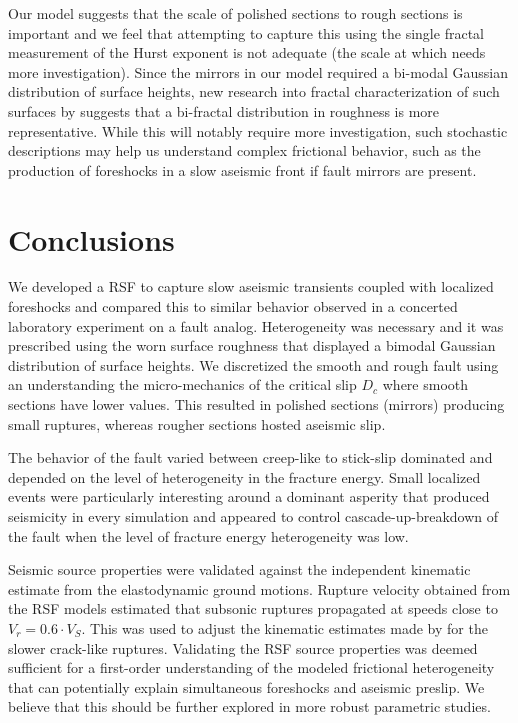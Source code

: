 \documentclass[preprint,1p, 10pt,authoryear]{elsarticle}
\begin{document}
Our model suggests that the scale of polished sections to rough sections is important and we feel that attempting to capture this using the single fractal measurement of the Hurst exponent is not adequate (the scale at which needs more investigation). Since the mirrors in our model required a bi-modal Gaussian distribution of surface heights, new research into fractal characterization of such surfaces by \citet{Hu2019} suggests that a bi-fractal distribution in roughness is more representative. While this will notably require more investigation, such stochastic descriptions may help us understand complex frictional behavior, such as the production of foreshocks in a slow aseismic front if fault mirrors are present.

\section{Conclusions}
We developed a RSF to capture slow aseismic transients coupled with localized foreshocks and compared this to similar behavior observed in a concerted laboratory experiment on a fault analog. Heterogeneity was necessary and it was prescribed using the worn surface roughness that displayed a bimodal Gaussian distribution of surface heights. We discretized the smooth and rough fault using an understanding the micro-mechanics of the critical slip $D_{c}$ where smooth sections have lower values. This resulted in polished sections (mirrors) producing small ruptures, whereas rougher sections hosted aseismic slip.  

The behavior of the fault varied between creep-like to stick-slip dominated and depended on the level of heterogeneity in the fracture energy. Small localized events were particularly interesting around a dominant asperity that produced seismicity in every simulation and appeared to control cascade-up-breakdown of the fault when the level of fracture energy heterogeneity was low. 

Seismic source properties were validated against the independent kinematic estimate from the elastodynamic ground motions.  Rupture velocity obtained from the RSF models estimated that subsonic ruptures propagated at speeds close to $V_r = 0.6\cdot V_{S}$.  This was used to adjust the kinematic estimates made by \citet{Selvadurai2019} for the slower crack-like ruptures. Validating the RSF source properties was deemed sufficient for a first-order understanding of the modeled frictional heterogeneity that can potentially explain simultaneous foreshocks and aseismic preslip. We believe that this should be further explored in more robust parametric studies. 
\end{document}
